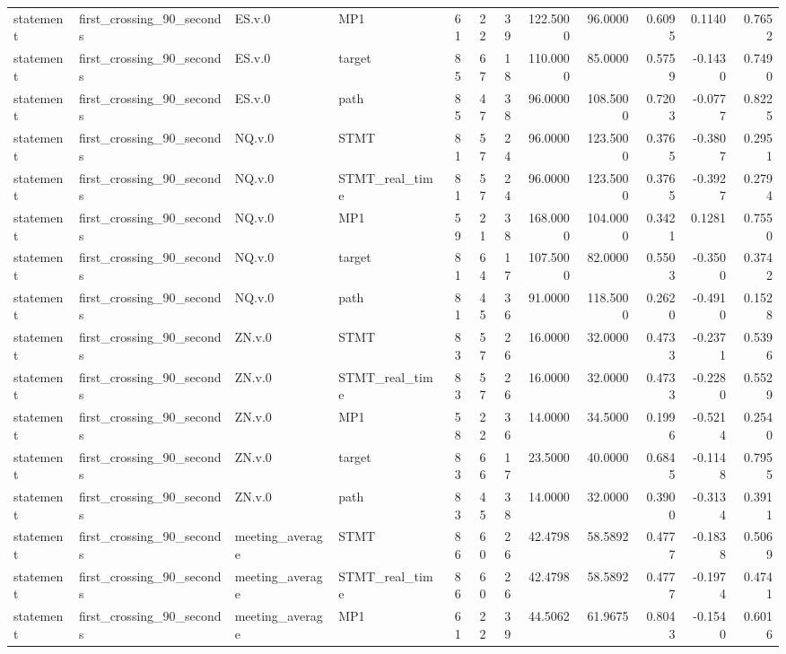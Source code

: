 \begin{tabular}{llllrrrrrrrr}
statement & first_crossing_90_seconds & ES.v.0 & MP1 & 61 & 22 & 39 & 122.5000 & 96.0000 & 0.6095 & 0.1140 & 0.7652 \\
statement & first_crossing_90_seconds & ES.v.0 & target & 85 & 67 & 18 & 110.0000 & 85.0000 & 0.5759 & -0.1430 & 0.7490 \\
statement & first_crossing_90_seconds & ES.v.0 & path & 85 & 47 & 38 & 96.0000 & 108.5000 & 0.7203 & -0.0777 & 0.8225 \\
statement & first_crossing_90_seconds & NQ.v.0 & STMT & 81 & 57 & 24 & 96.0000 & 123.5000 & 0.3765 & -0.3807 & 0.2951 \\
statement & first_crossing_90_seconds & NQ.v.0 & STMT_real_time & 81 & 57 & 24 & 96.0000 & 123.5000 & 0.3765 & -0.3927 & 0.2794 \\
statement & first_crossing_90_seconds & NQ.v.0 & MP1 & 59 & 21 & 38 & 168.0000 & 104.0000 & 0.3421 & 0.1281 & 0.7550 \\
statement & first_crossing_90_seconds & NQ.v.0 & target & 81 & 64 & 17 & 107.5000 & 82.0000 & 0.5503 & -0.3500 & 0.3742 \\
statement & first_crossing_90_seconds & NQ.v.0 & path & 81 & 45 & 36 & 91.0000 & 118.5000 & 0.2620 & -0.4910 & 0.1528 \\
statement & first_crossing_90_seconds & ZN.v.0 & STMT & 83 & 57 & 26 & 16.0000 & 32.0000 & 0.4733 & -0.2371 & 0.5396 \\
statement & first_crossing_90_seconds & ZN.v.0 & STMT_real_time & 83 & 57 & 26 & 16.0000 & 32.0000 & 0.4733 & -0.2280 & 0.5529 \\
statement & first_crossing_90_seconds & ZN.v.0 & MP1 & 58 & 22 & 36 & 14.0000 & 34.5000 & 0.1996 & -0.5214 & 0.2540 \\
statement & first_crossing_90_seconds & ZN.v.0 & target & 83 & 66 & 17 & 23.5000 & 40.0000 & 0.6845 & -0.1148 & 0.7955 \\
statement & first_crossing_90_seconds & ZN.v.0 & path & 83 & 45 & 38 & 14.0000 & 32.0000 & 0.3900 & -0.3134 & 0.3911 \\
statement & first_crossing_90_seconds & meeting_average & STMT & 86 & 60 & 26 & 42.4798 & 58.5892 & 0.4777 & -0.1838 & 0.5069 \\
statement & first_crossing_90_seconds & meeting_average & STMT_real_time & 86 & 60 & 26 & 42.4798 & 58.5892 & 0.4777 & -0.1974 & 0.4741 \\
statement & first_crossing_90_seconds & meeting_average & MP1 & 61 & 22 & 39 & 44.5062 & 61.9675 & 0.8043 & -0.1540 & 0.6016 \\

\end{tabular}
